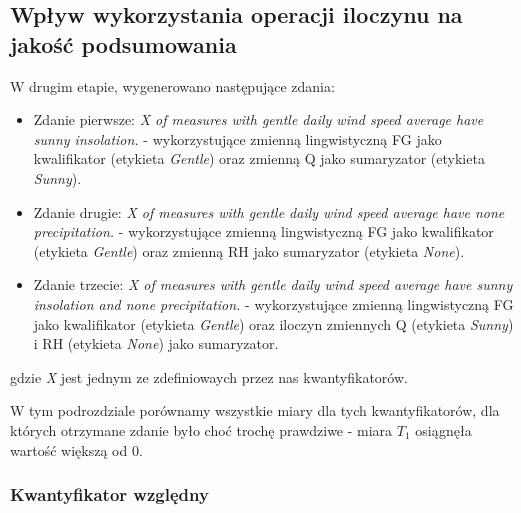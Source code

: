 \documentclass{classrep}
\begin{document}
\clearpage



\subsection{Wpływ wykorzystania operacji iloczynu na jakość podsumowania}

W drugim etapie, wygenerowano następujące zdania:
\begin{itemize}[label=$\bullet$\scshape\bfseries]
\item Zdanie pierwsze: \textit{X of measures with gentle daily wind speed average have sunny insolation.} - wykorzystujące zmienną lingwistyczną FG jako kwalifikator (etykieta \textit{Gentle}) oraz zmienną Q jako sumaryzator (etykieta \textit{Sunny}).
\item Zdanie drugie: \textit{X of measures with gentle daily wind speed average have none precipitation.} - wykorzystujące zmienną lingwistyczną FG jako kwalifikator (etykieta \textit{Gentle}) oraz zmienną RH jako sumaryzator (etykieta \textit{None}).
\item Zdanie trzecie: \textit{X of measures with gentle daily wind speed average have sunny insolation and none precipitation.} - wykorzystujące zmienną lingwistyczną FG jako kwalifikator (etykieta \textit{Gentle}) oraz iloczyn zmiennych Q (etykieta \textit{Sunny}) i RH (etykieta \textit{None})  jako sumaryzator.
\end{itemize}
gdzie \textit{X} jest jednym ze zdefiniowaych przez nas kwantyfikatorów.\newline

W tym podrozdziale porównamy wszystkie miary dla tych kwantyfikatorów, dla których otrzymane zdanie było choć trochę prawdziwe - miara $T_1$ osiągnęła wartość większą od 0.

\clearpage


\subsubsection{Kwantyfikator względny}
\end{document}
